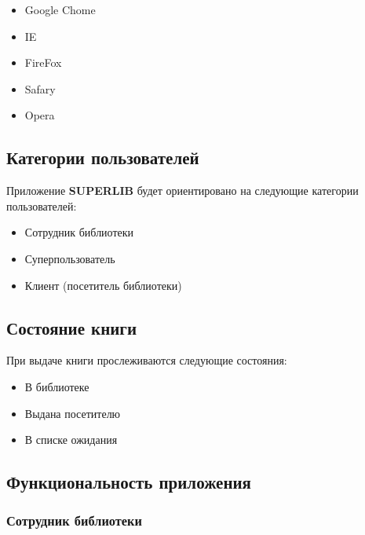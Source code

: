 \documentclass[a4paper,10pt]{article}
\begin{document}
            \begin{itemize}
                \item Google Chome
                \item IE 
                \item FireFox 
                \item Safary 
                \item Opera 
            \end{itemize}
            
         
        \subsection{Категории пользователей }

         
            Приложение \textbf{SUPERLIB} будет ориентировано на следующие категории пользователей: 

            \begin{itemize}
                \item Сотрудник библиотеки
                \item Суперпользователь
                \item Клиент (посетитель библиотеки)
            \end{itemize}

        \subsection{Состояние книги}

            При выдаче книги прослеживаются следующие состояния:

            \begin{itemize}
                \item В библиотеке
                \item Выдана посетителю
                \item В списке ожидания
            \end{itemize}

        \newpage

        \subsection{Функциональность приложения}

         
            \subsubsection{Сотрудник библиотеки}
\end{document}
